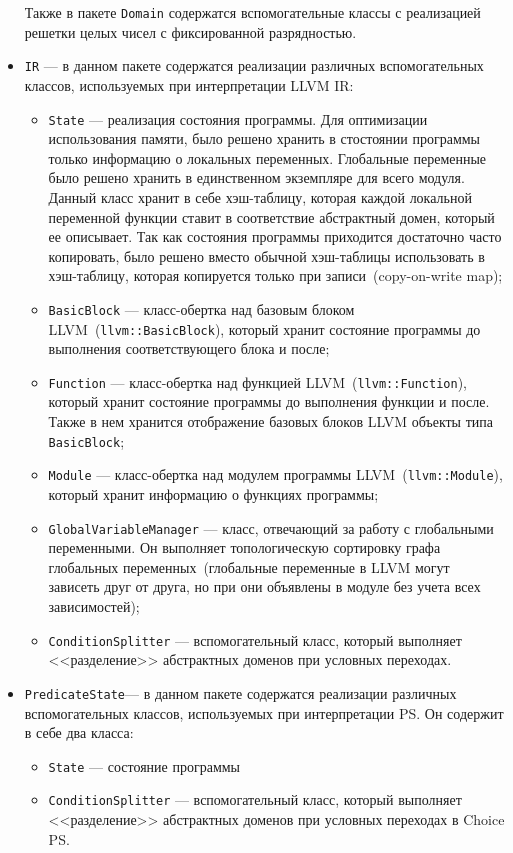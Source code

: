 \begin{itemize}
    Также в пакете \texttt{Domain} содержатся вспомогательные классы с 
    реализацией решетки целых чисел с фиксированной разрядностью.

\item \texttt{IR} --- в данном пакете содержатся реализации различных 
вспомогательных классов, используемых при интерпретации LLVM IR:
    \begin{itemize}
    \item \texttt{State} --- реализация состояния программы. Для оптимизации 
    использования памяти, было решено хранить в стостоянии программы только
    информацию о локальных переменных. Глобальные переменные было решено
    хранить в единственном экземпляре для всего модуля. Данный класс хранит в 
    себе хэш-таблицу, которая каждой локальной переменной функции ставит в 
    соответствие абстрактный домен, который ее описывает. Так как состояния 
    программы приходится достаточно часто копировать, было решено вместо
    обычной хэш-таблицы использовать в хэш-таблицу, которая копируется только
    при записи~(copy-on-write map);
    \item \texttt{BasicBlock} --- класс-обертка над базовым блоком 
    LLVM~(\texttt{llvm::BasicBlock}), который хранит состояние программы до
    выполнения соответствующего блока и после;
    \item \texttt{Function} --- класс-обертка над функцией 
    LLVM~(\texttt{llvm::Function}), который хранит состояние программы до 
    выполнения функции и после. Также в нем хранится отображение базовых блоков
    LLVM объекты типа \texttt{BasicBlock};
    \item \texttt{Module} --- класс-обертка над модулем программы
    LLVM~(\texttt{llvm::Module}), который хранит информацию о функциях 
    программы;
    \item \texttt{GlobalVariableManager} --- класс, отвечающий за работу с 
    глобальными переменными. Он выполняет топологическую сортировку графа
    глобальных переменных~(глобальные переменные в LLVM могут зависеть друг от
    друга, но при они объявлены в модуле без учета всех зависимостей);
    \item \texttt{ConditionSplitter} --- вспомогательный класс, который 
    выполняет <<разделение>> абстрактных доменов при условных переходах.
    \end{itemize}
\item \texttt{PredicateState}--- в данном пакете содержатся реализации 
различных вспомогательных классов, используемых при интерпретации PS. Он 
содержит в себе два класса:
    \begin{itemize}
    \item \texttt{State} --- состояние программы
    \item \texttt{ConditionSplitter} --- вспомогательный класс, который 
    выполняет <<разделение>> абстрактных доменов при условных переходах в 
    Choice PS.
    \end{itemize}
\end{itemize}